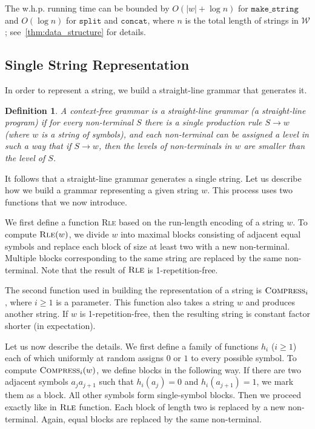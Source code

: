 \documentclass[a4paper]{article}
\newtheorem{definition}[theorem]{Definition}
\theoremstyle{remark}
\newcommand{\makeop}{\mathtt{make\_string}}
\newcommand{\concop}{\mathtt{concat}}
\newcommand{\splitop}{\mathtt{split}}
\newcommand{\compress}{\textsc{Compress}}
\newcommand{\rle}{\textsc{Rle}}
\newcommand{\str}{w}
\newcommand{\hs}{h}
\newcommand{\coll}{\mathcal{W}}
\begin{document}
The w.h.p. running time can be bounded by $O(|\str|+\log n)$ for $\makeop$ and $O(\log n)$ for $\splitop$ and $\concop$,
where $n$ is the total length of strings in $\coll$; see~\cref{thm:data_structure} for details.

\subsection{Single String Representation}\label{sec:single_string}
In order to represent a string, we build a straight-line grammar that generates it.
\begin{definition}
A context-free grammar is a \emph{straight-line grammar} (a straight-line program) if for every non-terminal $S$
there is a single production rule $S \rightarrow \str$ (where $\str$ is a string of symbols),
and each non-terminal can be assigned a level in such a way that if $S \rightarrow \str$, then the levels of non-terminals in $\str$ are smaller than the level of $S$.
\end{definition}
It follows that a straight-line grammar generates a single string.
Let us describe how we build a grammar representing a given string $\str$.
This process uses two functions that we now introduce.

We first define a function \rle{} based on the run-length encoding of a string $\str$.
To compute $\rle(\str)$, we divide $\str$ into maximal blocks consisting of adjacent equal symbols and replace each block of size at least two with a new non-terminal. Multiple blocks corresponding to the same string are replaced by the same non-terminal.
Note that the result of $\rle{}$ is 1-repetition-free.

The second function used in building the representation of a string is $\compress_i{}$, where $i \geq 1$ is a parameter.
This function also takes a string $\str$ and produces another string.
If $\str$ is 1-repetition-free, then the resulting string is constant factor shorter (in expectation).

Let us now describe the details.
We first define a family of functions $\hs_i$ ($i\ge 1$) each of which uniformly at random assigns $0$ or $1$ to every possible symbol.
To compute $\compress_i(\str)$, we define blocks in the following way.
If there are two adjacent symbols $a_j a_{j+1}$ such that $\hs_i(a_j) = 0$ and $\hs_i(a_{j+1}) = 1$, we mark them as a block.
All other symbols form single-symbol blocks.
Then we proceed exactly like in $\rle$ function.
Each block of length two is replaced by a new non-terminal.
Again, equal blocks are replaced by the same non-terminal.
\end{document}
